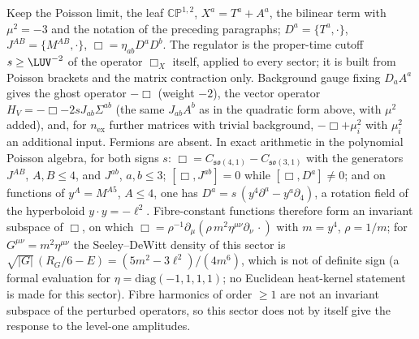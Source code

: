 Keep the Poisson limit, the leaf \(\mathbb{CP}^{1,2}\), \(X^a=T^a+A^a\), the bilinear term with \(\mu^2=-3\) and the notation of the preceding paragraphs; \(D^a=\{T^a,\cdot\}\), \(J^{AB}=\{M^{AB},\cdot\}\), \(\Box=\eta_{ab}D^aD^b\). The regulator is the proper-time cutoff \(s\ge\LUV^{-2}\) of the operator \(\Box_X\) itself, applied to every sector; it is built from Poisson brackets and the matrix contraction only. Background gauge fixing \(D_aA^a\) gives the ghost operator \(-\Box\) (weight \(-2\)), the vector operator \(H_V=-\Box-2sJ_{ab}\Sigma^{ab}\) (the same \(J_{ab}A^b\) as in the quadratic form above, with \(\mu^2\) added), and, for \(n_{\mathrm{ex}}\) further matrices with trivial background, \(-\Box+\mu_i^2\) with \(\mu_i^2\) an additional input. Fermions are absent. In exact arithmetic in the polynomial Poisson algebra, for both signs \(s\): \(\Box=C_{\mathfrak{so}(4,1)}-C_{\mathfrak{so}(3,1)}\) with the generators \(J^{AB}\), \(A,B\le4\), and \(J^{ab}\), \(a,b\le3\); \([\Box,J^{ab}]=0\) while \([\Box,D^a]\ne0\); and on functions of \(y^A=M^{A5}\), \(A\le4\), one has \(D^a=s\,(y^4\partial^a-y^a\partial_4)\), a rotation field of the hyperboloid \(y\cdot y=-\ell^2\). Fibre-constant functions therefore form an invariant subspace of \(\Box\), on which \(\Box=\rho^{-1}\partial_\mu(\rho\,m^2\eta^{\mu\nu}\partial_\nu\,\cdot)\) with \(m=y^4\), \(\rho=1/m\); for \(G^{\mu\nu}=m^2\eta^{\mu\nu}\) the Seeley--DeWitt density of this sector is \(\sqrt{|G|}\,(R_G/6-E)=(5m^2-3\ell^2)/(4m^6)\), which is not of definite sign (a formal evaluation for \(\eta=\mathrm{diag}(-1,1,1,1)\); no Euclidean heat-kernel statement is made for this sector). Fibre harmonics of order \(\ge1\) are not an invariant subspace of the perturbed operators, so this sector does not by itself give the response to the level-one amplitudes.



